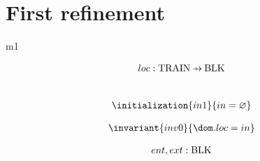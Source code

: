 \documentclass[12pt]{amsart}
\begin{document}
\section{First refinement}
\begin{machine}{m1}





\begin{use:set}{\Blk} \end{use:set}
\begin{use:fun}{\Train}{\Blk} \end{use:fun}


\begin{align*}
\variable{	loc : \Train \pfun \Blk}
\end{align*}


%

%

\begin{align*}
\\ \initialization{in1}
	{ in = \emptyset }
\end{align*}


\begin{align*}
\invariant{inv0}
	{	\dom.loc = in }
\end{align*}

\begin{align*}
	ent,ext : \text{BLK}
\end{align*}


\end{machine}
\end{document}
